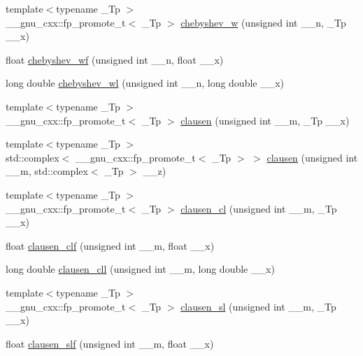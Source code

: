 \begin{DoxyCompactItemize}
{\footnotesize template$<$typename \+\_\+\+Tp $>$ }\\\+\_\+\+\_\+gnu\+\_\+cxx\+::fp\+\_\+promote\+\_\+t$<$ \+\_\+\+Tp $>$ \hyperlink{group__mathsf__gnu_gaa156c6c21e99104ebcb627e92aceada0}{chebyshev\+\_\+w} (unsigned int \+\_\+\+\_\+n, \+\_\+\+Tp \+\_\+\+\_\+x)
\item 
float \hyperlink{group__mathsf__gnu_gae6d468cee53df584e40afe294127b090}{chebyshev\+\_\+wf} (unsigned int \+\_\+\+\_\+n, float \+\_\+\+\_\+x)
\item 
long double \hyperlink{group__mathsf__gnu_ga1297dfd9b9a0f584435de7d83eb9e9c3}{chebyshev\+\_\+wl} (unsigned int \+\_\+\+\_\+n, long double \+\_\+\+\_\+x)
\item 
{\footnotesize template$<$typename \+\_\+\+Tp $>$ }\\\+\_\+\+\_\+gnu\+\_\+cxx\+::fp\+\_\+promote\+\_\+t$<$ \+\_\+\+Tp $>$ \hyperlink{group__mathsf__gnu_ga54e4ba71b1f81718d6998349f91ff88f}{clausen} (unsigned int \+\_\+\+\_\+m, \+\_\+\+Tp \+\_\+\+\_\+x)
\item 
{\footnotesize template$<$typename \+\_\+\+Tp $>$ }\\std\+::complex$<$ \+\_\+\+\_\+gnu\+\_\+cxx\+::fp\+\_\+promote\+\_\+t$<$ \+\_\+\+Tp $>$ $>$ \hyperlink{group__mathsf__gnu_gaf7c4317ef6bfd3a4bf0ddcba22ee7588}{clausen} (unsigned int \+\_\+\+\_\+m, std\+::complex$<$ \+\_\+\+Tp $>$ \+\_\+\+\_\+z)
\item 
{\footnotesize template$<$typename \+\_\+\+Tp $>$ }\\\+\_\+\+\_\+gnu\+\_\+cxx\+::fp\+\_\+promote\+\_\+t$<$ \+\_\+\+Tp $>$ \hyperlink{group__mathsf__gnu_ga8786b86db309998f93f877cfb9bdfd57}{clausen\+\_\+cl} (unsigned int \+\_\+\+\_\+m, \+\_\+\+Tp \+\_\+\+\_\+x)
\item 
float \hyperlink{group__mathsf__gnu_ga5e1bf6c24eb4359ffacb49da62f0838b}{clausen\+\_\+clf} (unsigned int \+\_\+\+\_\+m, float \+\_\+\+\_\+x)
\item 
long double \hyperlink{group__mathsf__gnu_gab06f3c94f96538167147f028711903a9}{clausen\+\_\+cll} (unsigned int \+\_\+\+\_\+m, long double \+\_\+\+\_\+x)
\item 
{\footnotesize template$<$typename \+\_\+\+Tp $>$ }\\\+\_\+\+\_\+gnu\+\_\+cxx\+::fp\+\_\+promote\+\_\+t$<$ \+\_\+\+Tp $>$ \hyperlink{group__mathsf__gnu_gacb757b00309213cd96bb2bc6b5dc3c24}{clausen\+\_\+sl} (unsigned int \+\_\+\+\_\+m, \+\_\+\+Tp \+\_\+\+\_\+x)
\item 
float \hyperlink{group__mathsf__gnu_gadd92821afcbfbdc79496b091b12a357f}{clausen\+\_\+slf} (unsigned int \+\_\+\+\_\+m, float \+\_\+\+\_\+x)

\end{DoxyCompactItemize}
